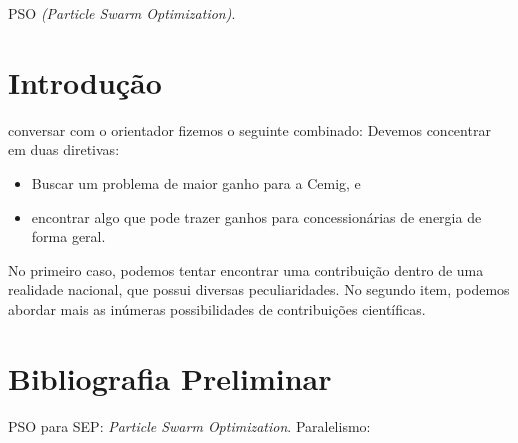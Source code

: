 \documentclass{IEEEtran}
\begin{document}
\begin{IEEEkeywords}
PSO \textit{(Particle Swarm Optimization)}.
\end{IEEEkeywords}

\IEEEpeerreviewmaketitle

\section{Introdução}
 conversar com o orientador fizemos o seguinte combinado:
Devemos concentrar em duas diretivas:
\begin{itemize}[]
\item Buscar um problema de maior ganho para a Cemig, e
\item encontrar algo que pode trazer ganhos para concessionárias de energia de forma geral.
\end{itemize}

No primeiro caso, podemos tentar encontrar uma contribuição dentro de uma realidade nacional, que possui diversas peculiaridades. No segundo item, podemos abordar mais as inúmeras possibilidades de contribuições científicas.

\section{Bibliografia Preliminar}
PSO para SEP: \textit{Particle Swarm Optimization}.
Paralelismo:
\end{document}
